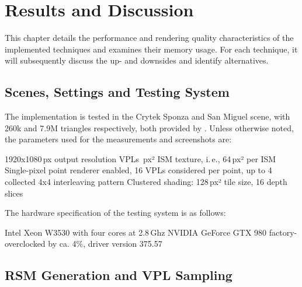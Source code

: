 

\chapter{Results and Discussion}
\label{chap:results}

This chapter details the performance and rendering quality characteristics of the implemented techniques and examines their memory usage. For each technique, it will subsequently discuss the up- and downsides and identify alternatives.

\section{Scenes, Settings and Testing System}
\label{sec:results:settings}

The implementation is tested in the Crytek Sponza and San Miguel scene, with 260k and 7.9M triangles respectively, both provided by \citet{McGuire2011Data}. Unless otherwise noted, the parameters used for the measurements and screenshots are:
\begin{outline}
    \1 1920x1080\,px output resolution
     VPLs
    \,px² ISM texture, i.\,e., 64\,px² per ISM
    \1 Single-pixel point renderer enabled, 16 VPLs considered per point, up to 4 collected
    \1 4x4 interleaving pattern
    \1 Clustered shading: 128\,px² tile size, 16 depth slices
\end{outline}

\noindent
The hardware specification of the testing system is as follows:
\begin{outline}
    \1 Intel Xeon W3530 with four cores at 2.8\,Ghz
    \1 NVIDIA GeForce GTX 980 factory-overclocked by ca. 4\%, driver version 375.57
\end{outline}


\section{RSM Generation and VPL Sampling}
\label{sec:results:RsmAndVplSampling}

